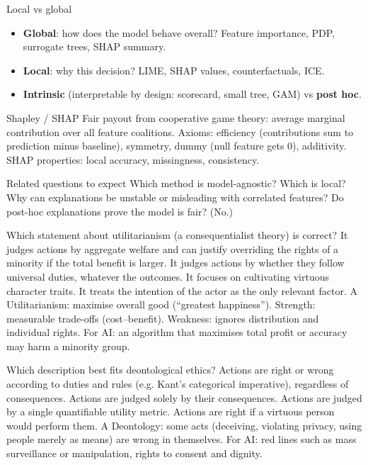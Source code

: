 {\begin{block}{Local vs global}
		\begin{itemize}
			\item \textbf{Global}: how does the model behave overall? Feature importance, PDP, surrogate trees, SHAP summary.
			\item \textbf{Local}: why this decision? LIME, SHAP values, counterfactuals, ICE.
			\item \textbf{Intrinsic} (interpretable by design: scorecard, small tree, GAM) vs \textbf{post hoc}.
\end{itemize}\end{block}}
{\begin{block}{Shapley / SHAP}
		Fair payout from cooperative game theory: average marginal contribution over all feature coalitions. Axioms: efficiency (contributions sum to prediction minus baseline), symmetry, dummy (null feature gets 0), additivity. SHAP properties: local accuracy, missingness, consistency.
	\end{block}
	\begin{alertblock}{Related questions to expect}
		Which method is model-agnostic? Which is local? Why can explanations be unstable or misleading with correlated features? Do post-hoc explanations prove the model is fair? (No.)
\end{alertblock}}

{Which statement about utilitarianism (a consequentialist theory) is correct?}
{It judges actions by aggregate welfare and can justify overriding the rights of a minority if the total benefit is larger.}
{It judges actions by whether they follow universal duties, whatever the outcomes.}
{It focuses on cultivating virtuous character traits.}
{It treats the intention of the actor as the only relevant factor.}
{A}
{Utilitarianism: maximise overall good (``greatest happiness''). Strength: measurable trade-offs (cost--benefit). Weakness: ignores distribution and individual rights. For AI: an algorithm that maximises total profit or accuracy may harm a minority group.}

{Which description best fits deontological ethics?}
{Actions are right or wrong according to duties and rules (e.g. Kant's categorical imperative), regardless of consequences.}
{Actions are judged solely by their consequences.}
{Actions are judged by a single quantifiable utility metric.}
{Actions are right if a virtuous person would perform them.}
{A}
{Deontology: some acts (deceiving, violating privacy, using people merely as means) are wrong in themselves. For AI: red lines such as mass surveillance or manipulation, rights to consent and dignity.}

